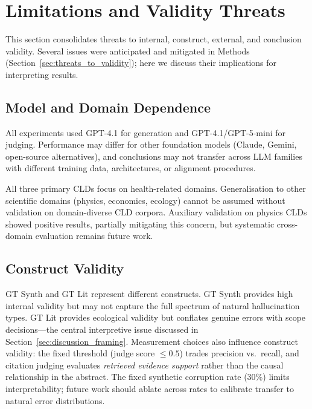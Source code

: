 \section{Limitations and Validity Threats}
\label{sec:discussion_limitations}

This section consolidates threats to internal, construct, external, and conclusion validity. Several issues were anticipated and mitigated in Methods (Section~\ref{sec:threats_to_validity}); here we discuss their implications for interpreting results.

\subsection{Model and Domain Dependence}

All experiments used GPT-4.1 for generation and GPT-4.1/GPT-5-mini for judging. Performance may differ for other foundation models (Claude, Gemini, open-source alternatives), and conclusions may not transfer across LLM families with different training data, architectures, or alignment procedures.

All three primary CLDs focus on health-related domains. Generalisation to other scientific domains (physics, economics, ecology) cannot be assumed without validation on domain-diverse CLD corpora. Auxiliary validation on physics CLDs showed positive results, partially mitigating this concern, but systematic cross-domain evaluation remains future work.

\subsection{Construct Validity}

GT Synth and GT Lit represent different constructs. GT Synth provides high internal validity but may not capture the full spectrum of natural hallucination types. GT Lit provides ecological validity but conflates genuine errors with scope decisions---the central interpretive issue discussed in Section~\ref{sec:discussion_framing}. Measurement choices also influence construct validity: the fixed threshold (judge score $\le 0.5$) trades precision vs.\ recall, and citation judging evaluates \emph{retrieved evidence support} rather than the causal relationship in the abstract. The fixed synthetic corruption rate (30\%) limits interpretability; future work should ablate across rates to calibrate transfer to natural error distributions.

